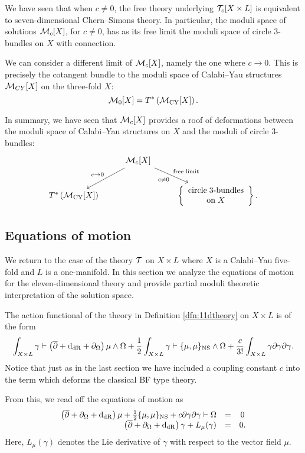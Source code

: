 \documentclass[11pt]{amsart}
\begin{document}
We have seen that when $c \ne 0$, the free theory underlying $\mathcal T_c[X \times L]$ is equivalent to seven-dimensional Chern--Simons theory.
In particular, the moduli space of solutions $\mathcal M_c[X]$, for $c \ne 0$, has as its free limit the moduli space of circle $3$-bundles on $X$ with connection.

We can consider a different limit of $\mathcal M_c[X]$, namely the one where $c \to 0$.
This is precisely the cotangent bundle to the moduli space of Calabi--Yau structures $\mathcal M_{CY}[X]$ on the three-fold $X$:
\[
  \mathcal M_0[X] = T^* \left(\mathcal M_{\rm CY} [X]\right) .
\]

In summary, we have seen that $\mathcal M_c[X]$ provides a roof of deformations between the moduli space of Calabi--Yau structures on $X$ and the moduli of circle $3$-bundles:
\[
  \begin{tikzcd}
    & \cM_c[X] \ar[dr, "c \ne 0"', "{\rm free\;limit}"] \ar[dl, "c \to 0"'] & \\ T^* \left(\cM_{\rm CY} [X] \right) & & \left\{ \begin{array}{ccc} \mbox{circle\;3-bundles} \\ {\rm on} \; X \end{array} \right\} .
  \end{tikzcd}
\]


\subsection{Equations of motion}
\label{sec:org2973a4d}
We return to the case of the theory $\mathcal T$ on $X\times L$ where $X$ is a Calabi--Yau five-fold and $L$ is a one-manifold.
In this section we analyze the equations of motion for the eleven-dimensional theory and provide partial moduli theoretic interpretation of the solution space.

The action functional of the theory in Definition \ref{dfn:11dtheory} on $X \times L$ is of the form
\[
  \int_{X \times L} \gamma \vdash \left(\overline{\partial} + {\rm d}_{\rm dR} + \partial_{\Omega}\right) \mu \wedge \Omega + \frac12 \int_{X \times L} \gamma \vdash \{\mu,\mu\}_{\rm NS} \wedge \Omega + \frac{c}{3!} \int_{X \times L} \gamma \partial \gamma \partial \gamma .
\]
Notice that just as in the last section we have included a coupling constant $c$ into the term which deforms the classical BF type theory.

From this, we read off the equations of motion as
\begin{equation}\label{eqn:eom}
  \begin{array}{rccc}
    \left(\overline{\partial} + \partial_\Omega + {\rm d}_{\rm dR} \right) \mu + \frac12 \{\mu, \mu\}_{\rm NS} + c \partial \gamma \partial \gamma \vdash \Omega & = & 0 \\
    \left(\overline{\partial} + \partial_\Omega + {\rm d}_{\rm dR} \right) \gamma + L_\mu (\gamma) & = & 0 .
  \end{array}
\end{equation}
Here, $L_\mu(\gamma)$ denotes the Lie derivative of $\gamma$ with respect to the vector field $\mu$.
\end{document}
